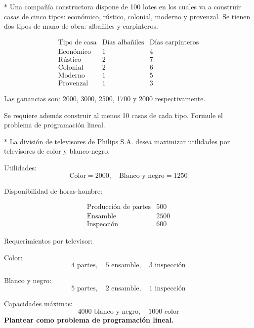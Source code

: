 \begin{Quest}*\label{Pregunta15}
Una compa\~n\'ia constructora dispone de 100 lotes en los cuales va a construir casas de cinco tipos: econ\'omico, r\'ustico, colonial, moderno y provenzal. Se tienen dos tipos de mano de obra: alba\~niles y carpinteros.

\[
\begin{array}{c|cc}
\text{Tipo de casa} & \text{D\'ias alba\~niles} & \text{D\'ias carpinteros} \\
\hline
\text{Econ\'omico} & 1 & 4 \\
\text{R\'ustico} & 2 & 7 \\
\text{Colonial} & 2 & 6 \\
\text{Moderno} & 1 & 5 \\
\text{Provenzal} & 1 & 3
\end{array}
\]

Las ganancias son:  
2000, 3000, 2500, 1700 y 2000 respectivamente.

Se requiere adem\'as construir al menos 10 casas de cada tipo. Formule el problema de programaci\'on lineal.

\end{Quest}


\begin{Quest}*\label{Pregunta16}
La divisi\'on de televisores de Philips S.A. desea maximizar utilidades por televisores de color y blanco-negro.

Utilidades:
\[
\text{Color} = 2000, \quad \text{Blanco y negro} = 1250
\]

Disponibilidad de horas-hombre:

\[
\begin{array}{c|c}
\text{Producci\'on de partes} & 500 \\
\text{Ensamble} & 2500 \\
\text{Inspecci\'on} & 600
\end{array}
\]

Requerimientos por televisor:

Color:
\[
4 \text{ partes},\quad 5 \text{ ensamble},\quad 3 \text{ inspecci\'on}
\]

Blanco y negro:
\[
5 \text{ partes},\quad 2 \text{ ensamble},\quad 1 \text{ inspecci\'on}
\]

Capacidades m\'aximas:
\[
4000 \text{ blanco y negro}, \quad 1000 \text{ color}
\]
\textbf{Plantear como problema de programaci\'on lineal.}
\end{Quest}


